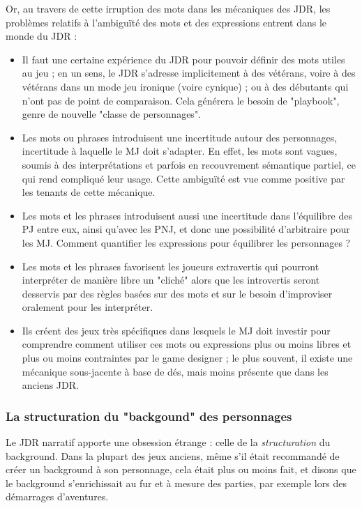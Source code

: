 \documentclass[a4paper, 11pt, twoside]{article}
\begin{document}
Or, au travers de cette irruption des mots dans les mécaniques des JDR, les problèmes relatifs à l'ambiguïté des mots et des expressions entrent dans le monde du JDR :

\begin{itemize}
\item Il faut une certaine expérience du JDR pour pouvoir définir des mots utiles au jeu ; en un sens, le JDR s'adresse implicitement à des vétérans, voire à des vétérans dans un mode jeu ironique (voire cynique) ; ou à des débutants qui n'ont pas de point de comparaison. Cela générera le besoin de "playbook", genre de nouvelle "classe de personnages".
\item Les mots ou phrases introduisent une incertitude autour des personnages, incertitude à laquelle le MJ doit s'adapter. En effet, les mots sont vagues, soumis à des interprétations et parfois en recouvrement sémantique partiel, ce qui rend compliqué leur usage. Cette ambiguïté est vue comme positive par les tenants de cette mécanique.
\item Les mots et les phrases introduisent aussi une incertitude dans l'équilibre des PJ entre eux, ainsi qu'avec les PNJ, et donc une possibilité d'arbitraire pour les MJ. Comment quantifier les expressions pour équilibrer les personnages ?
\item Les mots et les phrases favorisent les joueurs extravertis qui pourront interpréter de manière libre un "cliché" alors que les introvertis seront desservis par des règles basées sur des mots et sur le besoin d'improviser oralement pour les interpréter.
\item Ils créent des jeux très spécifiques dans lesquels le MJ doit investir pour comprendre comment utiliser ces mots ou expressions plus ou moins libres et plus ou moins contraintes par le game designer ; le plus souvent, il existe une mécanique sous-jacente à base de dés, mais moins présente que dans les anciens JDR.
\end{itemize}

\subsubsection{La structuration du "backgound" des personnages}
\label{sec:org72d09f5}

Le JDR narratif apporte une obsession étrange : celle de la \emph{structuration} du background. Dans la plupart des jeux anciens, même s'il était recommandé de créer un background à son personnage, cela était plus ou moins fait, et disons que le background s'enrichissait au fur et à mesure des parties, par exemple lors des démarrages d'aventures.
\end{document}
